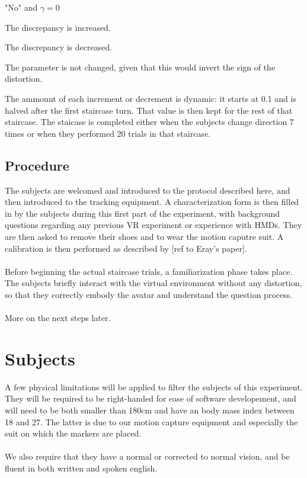 \begin{labeling}{"No" and $\gamma = 0$}
  \item ["Yes"] The discrepancy is increased.
  \item ["No" and $\gamma \neq 0$] The discrepancy is decreased.
  \item ["No" and $\gamma = 0$] The parameter is not changed, given that this would invert the sign of the distortion.
\end{labeling}

The ammount of each increment or decrement is dynamic: it starts at \num{0.1} and is halved after the first staircase turn. That value is then kept for the rest of that staircase. The staicase is completed either when the subjects change direction 7 times or when they performed 20 trials in that staircase.

\subsection{Procedure}

The subjects are welcomed and introduced to the protocol described here, and then introduced to the tracking equipment. A characterization form is then filled in by the subjects during this first part of the experiment, with background questions regarding any previous VR experiment or experience with HMDs. They are then asked to remove their shoes and to wear the motion caputre suit. A calibration is then performed as described by [ref to Eray's paper].
\\\\
Before beginning the actual staircase trials, a familiarization phase takes place. The subjects briefly interact with the virtual environment without any distortion, so that they correctly embody the avatar and understand the question process.
\\\\
More on the next steps later.

\section{Subjects}

A few physical limitations will be applied to filter the subjects of this experiment. They will be required to be right-handed for ease of software developement, and will need to be both smaller than 180cm and have an body mass index between 18 and 27. The latter is due to our motion capture equipment and especially the suit on which the markers are placed.
\\\\
We also require that they have a normal or corrected to normal vision, and be fluent in both written and spoken english.
